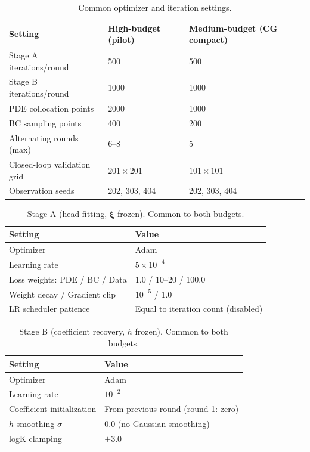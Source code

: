 \documentclass[pdflatex,sn-mathphys,Numbered,iicol]{sn-jnl}
\newcommand{\bxi}{\boldsymbol{\xi}}
\begin{document}
\begin{table}[!ht]
  \caption{Common optimizer and iteration settings.}
  \label{tab:config-budget}
  \centering\small
  \setlength{\tabcolsep}{3pt}
  \begin{tabular}{@{}p{}p{}p{}@{}}
    \toprule
    Setting & High-budget (pilot) & Medium-budget (CG compact) \\
    \midrule
    Stage A iterations/round & 500 & 500 \\
    Stage B iterations/round & 1000 & 1000 \\
    PDE collocation points & 2000 & 1000 \\
    BC sampling points & 400 & 200 \\
    Alternating rounds (max) & 6--8 & 5 \\
    Closed-loop validation grid & $201 \times 201$ & $101 \times 101$ \\
    Observation seeds & 202, 303, 404 & 202, 303, 404 \\
    \bottomrule
  \end{tabular}
\end{table}

\begin{table}[!ht]
  \caption{Stage A (head fitting, $\bxi$ frozen). Common to both budgets.}
  \label{tab:config-stageA}
  \centering\small
  \setlength{\tabcolsep}{3pt}
  \begin{tabular}{@{}p{}p{}@{}}
    \toprule
    Setting & Value \\
    \midrule
    Optimizer & Adam \\
    Learning rate & $5 \times 10^{-4}$ \\
    Loss weights: PDE / BC / Data & 1.0 / 10--20 / 100.0 \\
    Weight decay / Gradient clip & $10^{-5}$ / 1.0 \\
    LR scheduler patience & Equal to iteration count (disabled) \\
    \bottomrule
  \end{tabular}
\end{table}

\begin{table}[!ht]
  \caption{Stage B (coefficient recovery, $h$ frozen). Common to both budgets.}
  \label{tab:config-stageB}
  \centering\small
  \setlength{\tabcolsep}{3pt}
  \begin{tabular}{@{}p{}p{}@{}}
    \toprule
    Setting & Value \\
    \midrule
    Optimizer & Adam \\
    Learning rate & $10^{-2}$ \\
    Coefficient initialization & From previous round (round 1: zero) \\
    $h$ smoothing $\sigma$ & 0.0 (no Gaussian smoothing) \\
    logK clamping & $\pm 3.0$ \\
    \bottomrule
  \end{tabular}
\end{table}
\end{document}
